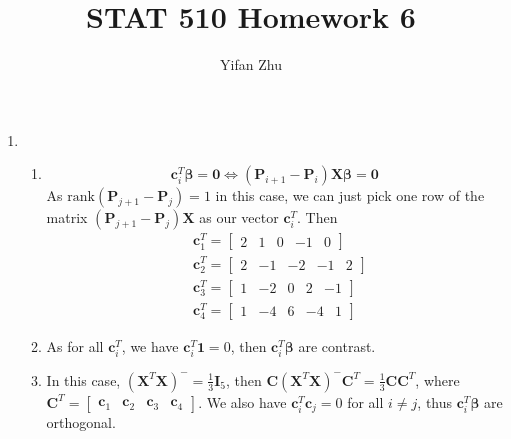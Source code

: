 \documentclass{article}
\begin{document}
\setcounter{MaxMatrixCols}{20}



\title{STAT 510 Homework 6}
\author{Yifan Zhu}
\maketitle

\begin{enumerate}[leftmargin = 0 em, label = \arabic*., font = \bfseries]
	\item
	      \begin{enumerate}
		      \item
		            \[\bm c_i^T \bm \beta = \bm 0 \iff (\bm P_{i+1} - \bm P_{i}) \bm X \bm \beta = \bm 0\]
		            As $\mathrm{rank}{(\bm P_{j+1} - \bm P_{j})} = 1$ in this case, we can just pick one row of the matrix $(\bm P_{j+1} - \bm P_{j}) \bm X$ as our vector $\bm c_{i}^T$.
		            Then
		            \begin{align*}
			              & \bm c_1^T = \begin{bmatrix}
				            2 & 1 & 0 & -1 & 0
			            \end{bmatrix}   \\
			              & \bm c_2^T = \begin{bmatrix}
				            2 & -1 & -2 & -1 & 2
			            \end{bmatrix}   \\
			              & \bm c_3^T = \begin{bmatrix}
				            1 & -2 & 0 & 2 & -1
			            \end{bmatrix}   \\
			              & \bm c_{4}^T = \begin{bmatrix}
				            1 & -4 & 6 & -4 & 1
			            \end{bmatrix}
		            \end{align*}


		      \item
		            As for all $\bm c_i^T$, we have $\bm c_i^T\bm 1 = 0$, then $\bm c_i^T \bm \beta$ are contrast.

		      \item
		            In this case, $(\bm X^T \bm X)^- = \frac{1}{3} \bm I_{5}$, then $\bm C (\bm X^T \bm X)^- \bm C^T = \frac{1}{3} \bm C \bm C^T $, where $\bm C^T = \begin{bmatrix}
				            \bm c_1 & \bm c_2 & \bm c_3 & \bm c_4
			            \end{bmatrix}$. We also have $\bm c_i^T \bm c_j = 0$ for all $i \neq j$, thus $\bm c_i^T \bm \beta$ are orthogonal.


\end{enumerate}
\end{enumerate}
\end{document}
